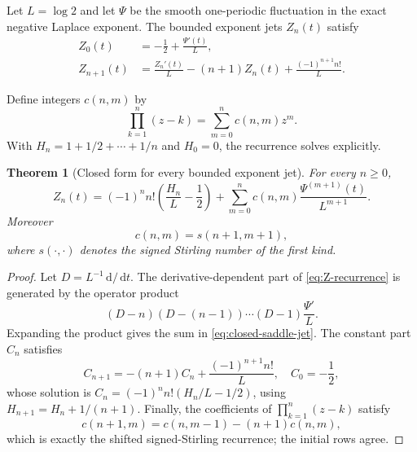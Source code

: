 \documentclass[11pt,oneside]{article}
\newtheorem{theorem}{Theorem}[section]
\theoremstyle{definition}
\theoremstyle{remark}
\newcommand{\dd}{\,\mathrm d}
\begin{document}
Let $L=\log2$ and let $\Psi$ be the smooth one-periodic fluctuation in the exact negative
Laplace exponent.  The bounded exponent jets $Z_n(t)$ satisfy
\begin{align}
 Z_0(t)&=-\frac12+\frac{\Psi'(t)}{L},                         \label{eq:Z0-recurrence}\\
 Z_{n+1}(t)&=\frac{Z_n'(t)}{L}-(n+1)Z_n(t)
              +\frac{(-1)^{n+1}n!}{L}.                      \label{eq:Z-recurrence}
\end{align}

Define integers $c(n,m)$ by
\begin{equation}
 \prod_{k=1}^{n}(z-k)=\sum_{m=0}^{n}c(n,m)z^m.
 \label{eq:falling-shift-coeff}
\end{equation}
With $H_n=1+1/2+\cdots+1/n$ and $H_0=0$, the recurrence solves explicitly.

\begin{theorem}[Closed form for every bounded exponent jet]
\label{thm:closed-saddle-jet}
For every $n\ge0$,
\begin{equation}
 Z_n(t)=(-1)^nn!\left(\frac{H_n}{L}-\frac12\right)
 +\sum_{m=0}^{n}c(n,m)
   \frac{\Psi^{(m+1)}(t)}{L^{m+1}}.
 \label{eq:closed-saddle-jet}
\end{equation}
Moreover
\begin{equation}
 c(n,m)=s(n+1,m+1),
 \label{eq:shifted-stirling}
\end{equation}
where $s(\cdot,\cdot)$ denotes the signed Stirling number of the first kind.
\end{theorem}

\begin{proof}
Let $D=L^{-1}\dd/\dd t$.  The derivative-dependent part of
\eqref{eq:Z-recurrence} is generated by the operator product
\begin{equation}
 (D-n)(D-(n-1))\cdots(D-1)\frac{\Psi'}L.
 \label{eq:jet-operator-product}
\end{equation}
Expanding the product gives the sum in \eqref{eq:closed-saddle-jet}.  The constant part
$C_n$ satisfies
\begin{equation}
 C_{n+1}=-(n+1)C_n+\frac{(-1)^{n+1}n!}{L},
 \quad C_0=-\frac12,
 \label{eq:jet-constant-recurrence}
\end{equation}
whose solution is $C_n=(-1)^nn!(H_n/L-1/2)$, using
$H_{n+1}=H_n+1/(n+1)$.  Finally, the coefficients of
$\prod_{k=1}^{n}(z-k)$ satisfy
\begin{equation}
 c(n+1,m)=c(n,m-1)-(n+1)c(n,m),
 \label{eq:c-stirling-recurrence}
\end{equation}
which is exactly the shifted signed-Stirling recurrence; the initial rows agree.
\end{proof}
\end{document}
